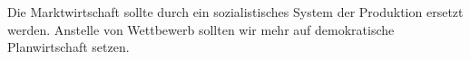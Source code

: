 Die Marktwirtschaft sollte durch ein sozialistisches System der Produktion ersetzt werden.
Anstelle von Wettbewerb sollten wir mehr auf demokratische Planwirtschaft setzen.